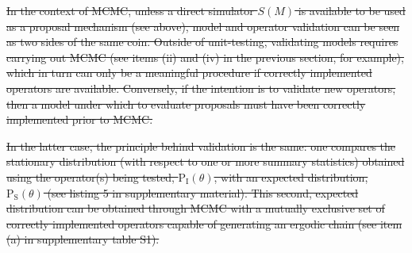 \documentclass[oneside]{article}
\providecommand{\DIFdeltex}[1]{{\protect\color{red}\sout{#1}}}                      %
\providecommand{\DIFdelbegin}{} %
\providecommand{\DIFdelend}{} %
\providecommand{\DIFdel}[1]{\texorpdfstring{\DIFdeltex{#1}}{}} %
\newcommand{\DIFscaledelfig}{0.5}
\newlength{\DIFdelgraphicswidth} %
\newlength{\DIFdelgraphicsheight} %
\newcommand{\DIFdelincludegraphics}[2][]{%
\sbox{\DIFdelgraphicsbox}{\DIFOincludegraphics[#1]{#2}}%
\settoboxwidth{\DIFdelgraphicswidth}{\DIFdelgraphicsbox} %
\settoboxtotalheight{\DIFdelgraphicsheight}{\DIFdelgraphicsbox} %
\scalebox{\DIFscaledelfig}{%
\parbox[b]{\DIFdelgraphicswidth}{\usebox{\DIFdelgraphicsbox}\\[-\baselineskip] \rule{\DIFdelgraphicswidth}{0em}}\llap{\resizebox{\DIFdelgraphicswidth}{\DIFdelgraphicsheight}{%
\setlength{\unitlength}{\DIFdelgraphicswidth}%
\begin{picture}(1,1)%
\thicklines\linethickness{2pt} %
{\color[rgb]{1,0,0}\put(0,0){\framebox(1,1){}}}%
{\color[rgb]{1,0,0}\put(0,0){\line( 1,1){1}}}%
{\color[rgb]{1,0,0}\put(0,1){\line(1,-1){1}}}%
\end{picture}%
}\hspace*{3pt}}} %
} %
\DeclareRobustCommand{\DIFdelbegin}{\DIFOdelbegin \let\includegraphics\DIFdelincludegraphics} %
\DeclareRobustCommand{\DIFdelend}{\DIFOaddend \let\includegraphics\DIFOincludegraphics} %
\begin{document}
\DIFdelbegin \DIFdel{In the context of MCMC, unless a direct simulator $S(M)$ is
available to be used as a proposal mechanism (see above), model and operator
validation can be seen as two sides of the same coin.
Outside of unit-testing, validating models requires carrying out MCMC
(see items (ii) and (iv) in the previous section, for example), which
in turn can only be a meaningful procedure if correctly implemented
operators are available.
Conversely, if the intention is to validate new operators, then a
model under which to evaluate proposals must have been correctly
implemented prior to MCMC.
}\DIFdelend %

\DIFdelbegin \DIFdel{In the latter case, the principle behind validation is the same: one
compares the stationary distribution (with respect to one or more summary
statistics) obtained using the operator(s)
being tested, $\text{P}_{\text{I}}(\theta)$, with an expected
distribution, $\text{P}_{\text{S}}(\theta)$ (see listing 5 in
supplementary material). 
This second, expected distribution can be obtained through MCMC with a
mutually exclusive set of correctly implemented operators capable of
generating an ergodic chain (see item
(a) in supplementary table S1). 
}\DIFdelend %
\end{document}
